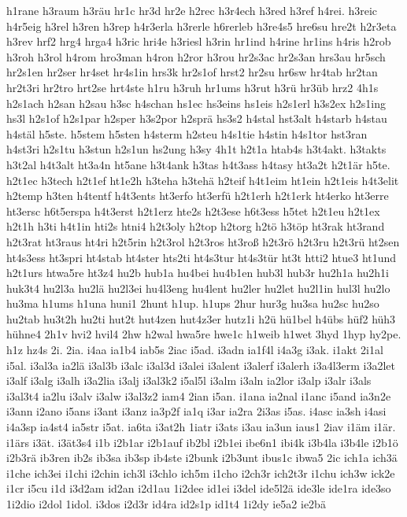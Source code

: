 {h1rane
h3raum
h3räu
hr1c
hr3d
hr2e
h2rec
h3r4ech
h3red
h3ref
h4rei.
h3reic
h4r5eig
h3rel
h3ren
h3rep
h4r3erla
h3rerle
h6rerleb
h3re4s5
hre6su
hre2t
h2r3eta
h3rev
hrf2
hrg4
hrga4
h3ric
hri4e
h3riesl
h3rin
hr1ind
h4rine
hr1ins
h4ris
h2rob
h3roh
h3rol
h4rom
hro3man
h4ron
h2ror
h3rou
hr2s3ac
hr2s3an
hrs3au
hr5sch
hr2s1en
hr2ser
hr4set
hr4s1in
hrs3k
hr2s1of
hrst2
hr2su
hr6sw
hr4tab
hr2tan
hr2t3ri
hr2tro
hrt2se
hrt4ste
h1ru
h3ruh
hr1ums
h3rut
h3rü
hr3üb
hrz2
4h1s
h2s1ach
h2san
h2sau
h3sc
h4schan
hs1ec
hs3eins
hs1eis
h2s1erl
h3s2ex
h2s1ing
hs3l
h2s1of
h2s1par
h2sper
h3s2por
h2sprä
hs3s2
h4stal
hst3alt
h4starb
h4stau
h4stäl
h5ste.
h5stem
h5sten
h4sterm
h2steu
h4s1tie
h4stin
h4s1tor
hst3ran
h4st3ri
h2s1tu
h3stun
h2s1un
hs2ung
h3sy
4h1t
h2t1a
htab4s
h3t4akt.
h3takts
h3t2al
h4t3alt
ht3a4n
ht5ane
h3t4ank
h3tas
h4t3ass
h4tasy
ht3a2t
h2t1är
h5te.
h2t1ec
h3tech
h2t1ef
ht1e2h
h3teha
h3tehä
h2teif
h4t1eim
ht1ein
h2t1eis
h4t3elit
h2temp
h3ten
h4tentf
h4t3ents
ht3erfo
ht3erfü
h2t1erh
h2t1erk
ht4erko
ht3erre
ht3ersc
h6t5erspa
h4t3erst
h2t1erz
hte2s
h2t3ese
h6t3ess
h5tet
h2t1eu
h2t1ex
h2t1h
h3ti
h4t1in
hti2s
htni4
h2t3oly
h2top
h2torg
h2tö
h3töp
ht3rak
ht3rand
h2t3rat
ht3raus
ht4ri
h2t5rin
h2t3rol
h2t3ros
ht3roß
h2t3rö
h2t3ru
h2t3rü
ht2sen
ht4s3ess
ht3spri
ht4stab
ht4ster
hts2ti
ht4s3tur
ht4s3tür
ht3t
htti2
htue3
ht1und
h2t1urs
htwa5re
ht3z4
hu2b
hub1a
hu4bei
hu4b1en
hub3l
hub3r
hu2h1a
hu2h1i
huk3t4
hu2l3a
hu2lä
hu2l3ei
hu4l3eng
hu4lent
hu2ler
hu2let
hu2l1in
hul3l
hu2lo
hu3ma
h1ums
h1una
huni1
2hunt
h1up.
h1ups
2hur
hur3g
hu3sa
hu2sc
hu2so
hu2tab
hu3t2h
hu2ti
hut2t
hut4zen
hut4z3er
hutz1i
h2ü
hü1bel
h4übs
hüf2
hüh3
hühne4
2h1v
hvi2
hvil4
2hw
h2wal
hwa5re
hwe1c
h1weib
h1wet
3hyd
1hyp
hy2pe.
h1z
hz4s
2i.
2ia.
i4aa
ia1b4
iab5s
2iac
i5ad.
i3adn
ia1f4l
i4a3g
i3ak.
i1akt
2i1al
i5al.
i3al3a
ia2lä
i3al3b
i3alc
i3al3d
i3alei
i3alent
i3alerf
i3alerh
i3a4l3erm
i3a2let
i3alf
i3alg
i3alh
i3a2lia
i3alj
i3al3k2
i5al5l
i3alm
i3aln
ia2lor
i3alp
i3alr
i3als
i3al3t4
ia2lu
i3alv
i3alw
i3al3z2
iam4
2ian
i5an.
i1ana
ia2nal
i1anc
i5and
ia3n2e
i3ann
i2ano
i5ans
i3ant
i3anz
ia3p2f
ia1q
i3ar
ia2ra
2i3as
i5as.
i4asc
ia3sh
i4asi
i4a3sp
ia4st4
ia5str
i5at.
ia6ta
i3at2h
1iatr
i3ats
i3au
ia3un
iaus1
2iav
i1äm
i1är.
i1ärs
i3ät.
i3ät3s4
i1b
i2b1ar
i2b1auf
ib2bl
i2b1ei
ibe6n1
ibi4k
i3b4la
i3b4le
i2b1ö
i2b3rä
ib3ren
ib2s
ib3sa
ib3sp
ib4ste
i2bunk
i2b3unt
ibus1c
ibwa5
2ic
ich1a
ich3ä
i1che
ich3ei
i1chi
i2chin
ich3l
i3chlo
ich5m
i1cho
i2ch3r
ich2t3r
i1chu
ich3w
ick2e
i1cr
i5cu
i1d
i3d2am
id2an
i2d1au
1i2dee
id1ei
i3del
ide5l2ä
ide3le
ide1ra
ide3so
1i2dio
i2dol
1idol.
i3dos
i2d3r
id4ra
id2s1p
id1t4
1i2dy
ie5a2
ie2bä
}

